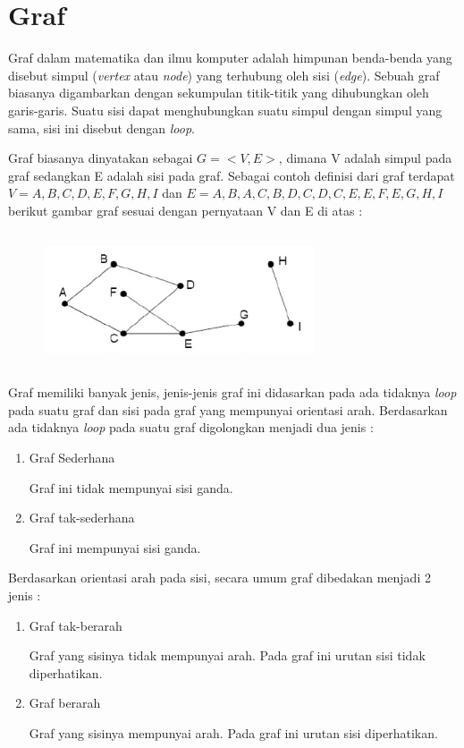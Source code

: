 \section{Graf}
\label{sec:graf}
Graf dalam matematika dan ilmu komputer adalah himpunan benda-benda yang disebut simpul (\textit{vertex} atau \textit{node}) yang terhubung oleh sisi (\textit{edge}). Sebuah graf biasanya digambarkan dengan sekumpulan titik-titik yang dihubungkan oleh garis-garis. Suatu sisi dapat menghubungkan suatu simpul dengan simpul yang sama, sisi ini disebut dengan \textit{loop}.

Graf biasanya dinyatakan sebagai $G = <V,E>$, dimana V adalah simpul pada graf sedangkan E adalah sisi pada graf. Sebagai contoh definisi dari graf terdapat $V = {A,B,C,D,E,F,G,H,I}$ dan $E = {{A,B},{A,C},{B,D},{C,D},{C,E},{E,F},{E,G},{H,I}}$ berikut gambar graf sesuai dengan pernyataan V dan E di atas :

	\begin{figure} [H]
		\centering  
		\includegraphics[width=8cm, height=4cm]{graf5} 
		\label{fig:graf5} 
	\end{figure}
	
Graf memiliki banyak jenis, jenis-jenis graf ini didasarkan pada ada tidaknya \textit{loop} pada suatu graf dan sisi pada graf yang mempunyai orientasi arah. Berdasarkan ada tidaknya \textit{loop} pada suatu graf digolongkan menjadi dua jenis :
\begin{enumerate}
	\item Graf Sederhana
	
	Graf ini tidak mempunyai sisi ganda.
	\item Graf tak-sederhana
	
	Graf ini mempunyai sisi ganda.
\end{enumerate}

Berdasarkan orientasi arah pada sisi, secara umum graf dibedakan menjadi 2 jenis :
\begin{enumerate}
	\item Graf tak-berarah
	
	Graf yang sisinya tidak mempunyai arah. Pada graf ini urutan sisi tidak diperhatikan.
	\item Graf berarah
	
	Graf yang sisinya mempunyai arah. Pada graf ini urutan sisi diperhatikan. \cite{referensiCA5}
\end{enumerate}

